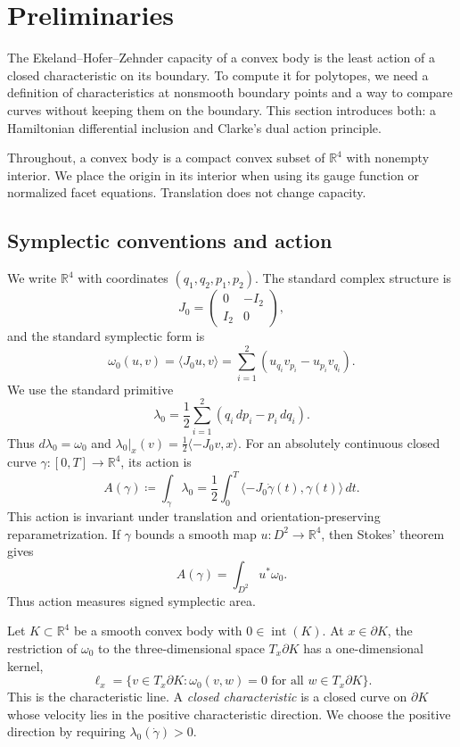 \section{Preliminaries}\label{sec:preliminaries}

The Ekeland--Hofer--Zehnder capacity of a convex body is the least action
of a closed characteristic on its boundary. To compute it for polytopes,
we need a definition of characteristics at nonsmooth boundary points and
a way to compare curves without keeping them on the boundary. This section
introduces both: a Hamiltonian differential inclusion and Clarke's dual
action principle.

Throughout, a convex body is a compact convex subset of $\mathbb R^4$ with
nonempty interior. We place the origin in its interior when using its gauge
function or normalized facet equations. Translation does not change capacity.


\subsection{Symplectic conventions and action}\label{subsec:preliminaries-polytopes}

We write \(\mathbb{R}^4\) with coordinates \((q_1,q_2,p_1,p_2)\). The standard
complex structure is
\[
  J_0 =
  \begin{pmatrix}
    0 & -I_2 \\
    I_2 & 0
  \end{pmatrix},
\]
and the standard symplectic form is
\[
  \omega_0(u,v) = \langle J_0u,v\rangle
  = \sum_{i=1}^2 (u_{q_i}v_{p_i}-u_{p_i}v_{q_i}).
\]
We use the standard primitive
\[
  \lambda_0 = \frac{1}{2}\sum_{i=1}^2(q_i\,dp_i-p_i\,dq_i).
\]
Thus \(d\lambda_0=\omega_0\) and
\(\lambda_0|_x(v)=\frac12\langle -J_0v,x\rangle\).
For an absolutely continuous closed curve
\(\gamma\colon[0,T]\to\mathbb{R}^4\), its action is
\begin{equation}\label{eq:preliminaries-action}
  A(\gamma) \coloneqq \int_\gamma \lambda_0
  = \frac{1}{2}\int_0^T
    \langle -J_0\dot{\gamma}(t),\gamma(t)\rangle\,dt.
\end{equation}
This action is invariant under translation and orientation-preserving
reparametrization.
If \(\gamma\) bounds a smooth map \(u\colon D^2\to\mathbb{R}^4\), then Stokes'
theorem gives
\[
  A(\gamma)=\int_{D^2}u^*\omega_0.
\]
Thus action measures signed symplectic area.

Let \(K\subset\mathbb{R}^4\) be a smooth convex body with
\(0\in\operatorname{int}(K)\). At \(x\in\partial K\), the restriction of
\(\omega_0\) to the three-dimensional space \(T_x\partial K\) has a
one-dimensional kernel,
\[
  \ell_x
  =
  \{v\in T_x\partial K:\omega_0(v,w)=0
    \text{ for all }w\in T_x\partial K\}.
\]
This is the characteristic line. A \emph{closed characteristic} is a closed
curve on \(\partial K\) whose velocity lies in the positive characteristic
direction. We choose the positive direction by requiring
\(\lambda_0(\dot{\gamma})>0\).


